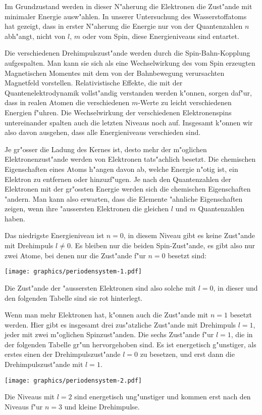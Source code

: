 Im Grundzustand werden in dieser N"aherung die Elektronen die Zust"ande
mit minimaler Energie ausw"ahlen.
In unserer Untersuchung des Wasserstoffatoms hat gezeigt, dass in
erster N"aherung die Energie nur von der Quantenzahlen $n$ abh"angt,
nicht von $l$, $m$ oder vom Spin, diese Energieniveaus sind entartet.

Die verschiedenen Drehimpulszust"ande werden durch die Spin-Bahn-Kopplung
aufgespalten.
Man kann sie sich als eine Wechselwirkung des vom Spin erzeugten
Magnetischen Momentes mit dem von der Bahnbewegung verursachten
Magnetfeld vorstellen.
Relativistische Effekte, die mit der Quantenelektrodynamik vollst"andig
verstanden werden k"onnen, sorgen daf"ur, dass in realen Atomen
die verschiedenen $m$-Werte zu leicht verschiedenen Energien f"uhren.
Die Wechselwirkung der verschiedenen Elektronenspins untereinander
spalten auch die letzten Niveaus noch auf.
Insgesamt k"onnen wir also davon ausgehen, dass alle Energieniveaus
verschieden sind.

Je gr"osser die Ladung des Kernes ist, desto mehr der m"oglichen
Elektronenzust"ande werden von Elektronen tats"achlich besetzt.
Die chemischen Eigenschaften eines Atoms h"angen davon ab, welche
Energie n"otig ist, ein Elektron zu entfernen oder hinzuzf"ugen.
Je nach den Quantenzahlen der Elektronen mit der gr"ossten Energie
werden sich die chemischen Eigenschaften "andern.
Man kann also erwarten, dass die Elemente "ahnliche Eigenschaften
zeigen, wenn ihre "aussersten Elektronen die gleichen $l$ und $m$
Quantenzahlen haben.

Das niedrigste Energieniveau ist $n=0$, in diesem Niveau gibt es
keine Zust"ande mit Drehimpuls $l\ne 0$. Es bleiben nur die
beiden Spin-Zust"ande, es gibt also nur zwei Atome, bei denen nur
die Zust"ande f"ur $n=0$ besetzt sind:
\begin{center}
\texttt{[image: graphics/periodensystem-1.pdf]}
\end{center}
Die Zust"ande der "aussersten Elektronen sind also solche mit
$l=0$, in dieser und den folgenden Tabelle sind sie rot
hinterlegt.

Wenn man mehr Elektronen hat, k"onnen auch die Zust"ande mit $n=1$ 
besetzt werden.
Hier gibt es insgesamt drei zus"atzliche Zust"ande mit Drehimpuls $l=1$,
jeder mit zwei m"oglichen Spinzust"anden.
Die sechs Zust"ande f"ur $l=1$, die in der folgenden Tabelle 
gr"un hervorgehoben sind.
Es ist energetisch g"unstiger, als erstes einen der
Drehimpulszust"ande $l=0$ zu besetzen, und erst dann die Drehimpulszust"ande
mit $l=1$.
\begin{center}
\texttt{[image: graphics/periodensystem-2.pdf]}
\end{center}
Die Niveaus mit $l=2$ sind energetisch ung"unstiger und kommen erst nach
den Niveaus f"ur $n=3$ und kleine Drehimpulse.

